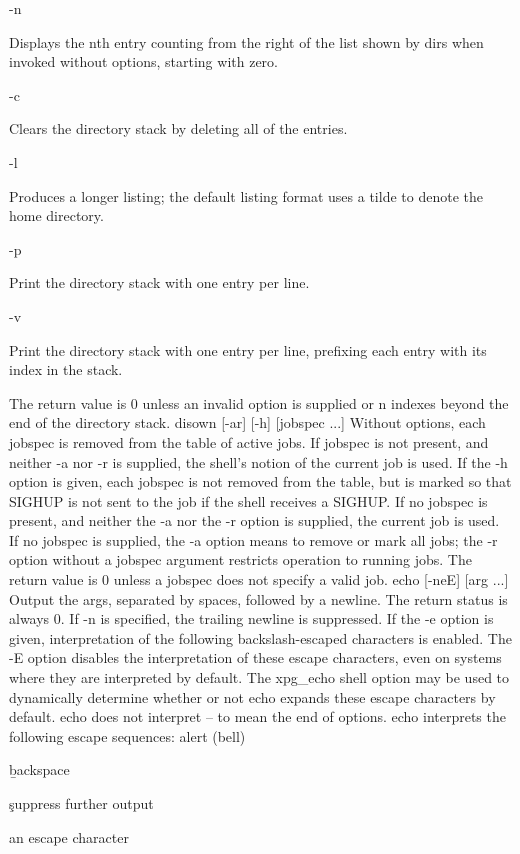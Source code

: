 {-n

Displays the nth entry counting from the right of the list shown by dirs when invoked without options, starting with zero.

-c

Clears the directory stack by deleting all of the entries.

-l

Produces a longer listing; the default listing format uses a tilde to denote the home directory.

-p

Print the directory stack with one entry per line.

-v

Print the directory stack with one entry per line, prefixing each entry with its index in the stack.

The return value is 0 unless an invalid option is supplied or n indexes beyond the end of the directory stack.
disown [-ar] [-h] [jobspec ...]
Without options, each jobspec is removed from the table of active jobs. If jobspec is not present, and neither -a nor -r is supplied, the shell's notion of the current job is used. If the -h option is given, each jobspec is not removed from the table, but is marked so that SIGHUP is not sent to the job if the shell receives a SIGHUP. If no jobspec is present, and neither the -a nor the -r option is supplied, the current job is used. If no jobspec is supplied, the -a option means to remove or mark all jobs; the -r option without a jobspec argument restricts operation to running jobs. The return value is 0 unless a jobspec does not specify a valid job.
echo [-neE] [arg ...]
Output the args, separated by spaces, followed by a newline. The return status is always 0. If -n is specified, the trailing newline is suppressed. If the -e option is given, interpretation of the following backslash-escaped characters is enabled. The -E option disables the interpretation of these escape characters, even on systems where they are interpreted by default. The xpg\_echo shell option may be used to dynamically determine whether or not echo expands these escape characters by default. echo does not interpret -- to mean the end of options. echo interprets the following escape sequences:
\a
alert (bell)

\b

backspace

\c

suppress further output

\e

an escape character

}
